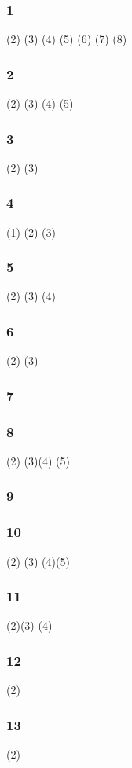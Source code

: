 \subsubsection*{1} (2)  (3) (4) (5) (6)  (7) (8) 
\subsubsection*{2}  (2) (3) (4) (5) 

\subsubsection*{3}(2) (3) 
\subsubsection*{4} (1) 
(2)  (3) 

\subsubsection*{5}   (2) (3) (4) 

\subsubsection*{6}  (2) (3) 
\subsubsection*{7}

\subsubsection*{8}  (2) (3)(4)  (5) 

\subsubsection*{9} 
\subsubsection*{10} (2) (3)  (4)(5)

\subsubsection*{11} (2)(3) (4)  
\subsubsection*{12} (2)  

\subsubsection*{13}(2)   


